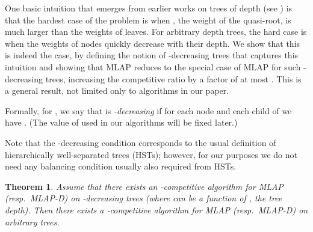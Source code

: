 \documentclass[a4paper]{article}
\newtheorem{theorem}{Theorem}[section]
\newcommand{\MLAP}{\mbox{\rm\textsf{MLAP}}}
\newcommand{\MLAPD}{\mbox{\rm\textsf{MLAP-D}}}
\begin{document}
One basic intuition that emerges from earlier works on trees of depth
 (see \cite{jrp-online-buchbinder,aggregation-bkv,jrp-soda-2014})
is that the hardest case of the problem is when , the
weight of the quasi-root, is much larger than the weights of
leaves. For arbitrary depth trees, the hard case is when the weights
of nodes quickly decrease with their depth. We show that this is
indeed the case, by defining the notion of -decreasing trees that
captures this intuition and showing that {\MLAP} reduces to the
special case of {\MLAP} for such -decreasing trees, increasing the
competitive ratio by a factor of at most .  This is a general
result, not limited only to algorithms in our paper.

Formally, for , we say
that  is \emph{-decreasing} if for each node  and
each child  of  we have .
(The value of  used in our algorithms will be fixed later.) 
 
Note that the -decreasing condition corresponds to the usual
definition of hierarchically well-separated trees (HSTs); however, for our
purposes we do not need any balancing condition usually also required from HSTs.


\begin{theorem}\label{thm:reduction}
Assume that there exists an -competitive algorithm  for
{\MLAP} (resp.~{\MLAPD}) on -decreasing trees (where  can be a
function of , the tree depth).  Then there exists a
-competitive algorithm  for {\MLAP} (resp.~{\MLAPD}) on
arbitrary trees.
\end{theorem}
\end{document}
